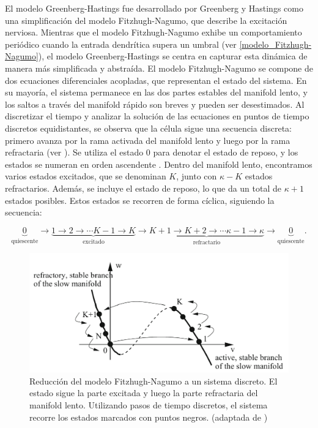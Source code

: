 El modelo Greenberg-Hastings fue desarrollado por Greenberg y Hastings como una simplificación del modelo Fitzhugh-Nagumo, que describe la excitación nerviosa. Mientras que el modelo Fitzhugh-Nagumo exhibe un comportamiento periódico cuando la entrada dendrítica supera un umbral  (ver \cref{modelo_Fitzhugh-Nagumo}), el modelo Greenberg-Hastings se centra en capturar esta dinámica de manera más simplificada y abstraída. El modelo Fitzhugh-Nagumo se compone de dos ecuaciones diferenciales acopladas, que representan el estado del sistema. En su mayoría, el sistema permanece en las dos partes estables del manifold lento, y los saltos a través del manifold rápido son breves y pueden ser desestimados. Al discretizar el tiempo y analizar la solución de las ecuaciones en puntos de tiempo discretos equidistantes, se observa que la célula sigue una secuencia discreta: primero avanza por la rama activada del manifold lento y luego por la rama refractaria (ver  ). Se utiliza el estado 0 para denotar el estado de reposo, y los estados se numeran en orden ascendente \cite{hadeler_cellular_2017}. Dentro del manifold lento, encontramos varios estados excitados, que se denominan $K$, junto con $\kappa - K$ estados refractarios. Además, se incluye el estado de reposo, lo que da un total de $\kappa + 1$ estados posibles. Estos estados se recorren de forma cíclica, siguiendo la secuencia:

\begin{equation}
	\underbrace{0}_{\text{quiescente}}\to \underbrace{1\to2\to\cdots K-1\to K}_{\text{excitado}}\to\underbrace{K+1\to K+2\to\cdots \kappa-1\to \kappa}_{\text{refractario}}\to\underbrace{0}_{\text{quiescente}}.
\end{equation}

\begin{figure}[ht]
	\centering\includegraphics[width=\imsize]{Nagumo.png}
	\caption[Reducción del modelo Fitzhugh-Nagumo a un sistema discreto. ]{Reducción del modelo Fitzhugh-Nagumo a un sistema discreto. El estado sigue la parte excitada y luego la parte refractaria del manifold lento. Utilizando pasos de tiempo discretos, el sistema recorre los estados marcados con puntos negros. (adaptada de \protect\cite{hadeler_cellular_2017})}\label{fig:Nagumo}
\end{figure}

